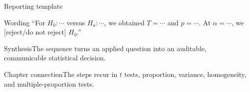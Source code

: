 \documentclass[10pt,aspectratio=169]{beamer}
\begin{document}
\begin{frame}{Reporting template}\small\begin{block}{Wording} ``For $H_0:\cdots$ versus $H_a:\cdots$, we obtained $T=\cdots$ and $p=\cdots$. At $\alpha=\cdots$, we [reject/do not reject] $H_0$.''\end{block}\end{frame}
\begin{frame}{Synthesis}\small The sequence turns an applied question into an auditable, communicable statistical decision.\end{frame}
\begin{frame}{Chapter connection}\small The steps recur in $t$ tests, proportion, variance, homogeneity, and multiple-proportion tests.\end{frame}
\end{document}
